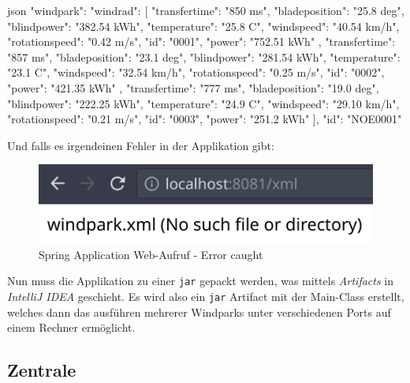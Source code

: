 \begin{code}{json}
    {"windpark": {
        "windrad": [
            {
                "transfertime": "850 ms",
                "bladeposition": "25.8 deg",
                "blindpower": "382.54 kWh",
                "temperature": "25.8 C",
                "windspeed": "40.54 km/h",
                "rotationspeed": "0.42 m/s",
                "id": "0001",
                "power": "752.51 kWh"
            },
            {
                "transfertime": "857 ms",
                "bladeposition": "23.1 deg",
                "blindpower": "281.54 kWh",
                "temperature": "23.1 C",
                "windspeed": "32.54 km/h",
                "rotationspeed": "0.25 m/s",
                "id": "0002",
                "power": "421.35 kWh"
            },
            {
                "transfertime": "777 ms",
                "bladeposition": "19.0 deg",
                "blindpower": "222.25 kWh",
                "temperature": "24.9 C",
                "windspeed": "29.10 km/h",
                "rotationspeed": "0.21 m/s",
                "id": "0003",
                "power": "251.2 kWh"
            }
        ],
        "id": "NOE0001"
    }}
\end{code}

Und falls es irgendeinen Fehler in der Applikation gibt:

\begin{figure}
    \caption{Spring Application Web-Aufruf - Error caught}
    \includegraphics[width=15cm]{images/spring-app-filenotfound}
    \centering
\end{figure}

Nun muss die Applikation zu einer \texttt{jar} gepackt werden, was mittels \textit{Artifacts} in \textit{IntelliJ IDEA} geschieht. Es wird also ein \texttt{jar} Artifact mit der Main-Class erstellt, welches dann das ausführen mehrerer Windparks unter verschiedenen Ports auf einem Rechner ermöglicht.


\clearpage
\subsection{Zentrale}

